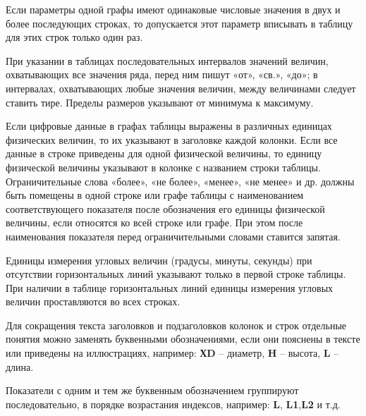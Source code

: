 Если параметры одной графы имеют одинаковые числовые значения в двух и более
последующих строках, то допускается этот параметр вписывать в таблицу для этих строк только
один раз.

При указании в таблицах последовательных интервалов значений величин,
охватывающих все значения ряда, перед ним пишут «от», «св.», «до»; в интервалах,
охватывающих любые значения величин, между величинами следует ставить тире. Пределы
размеров указывают от минимума к максимуму.

Если цифровые данные в графах таблицы выражены в различных единицах физических
величин, то их указывают в заголовке каждой колонки. Если все данные в строке приведены для
одной физической величины, то единицу физической величины указывают в колонке с
названием строки таблицы. Ограничительные слова «более», «не более», «менее», «не менее» и
др. должны быть помещены в одной строке или графе таблицы с наименованием
соответствующего показателя после обозначения его единицы физической величины, если
относятся ко всей строке или графе. При этом после наименования показателя перед
ограничительными словами ставится запятая.

Единицы измерения угловых величин (градусы, минуты, секунды) при отсутствии
горизонтальных линий указывают только в первой строке таблицы. При наличии в таблице
горизонтальных линий единицы измерения угловых величин проставляются во всех строках.

Для сокращения текста заголовков и подзаголовков колонок и строк отдельные понятия
можно заменять буквенными обозначениями, если они пояснены в тексте или приведены на
иллюстрациях, например: {\bf ХD} -- диаметр, {\bf H} --  высота, {\bf L} -- длина.

Показатели с одним и тем же буквенным обозначением группируют последовательно, в
порядке возрастания индексов, например: {\bf L}, {\bf L1},{\bf L2} и т.д.

